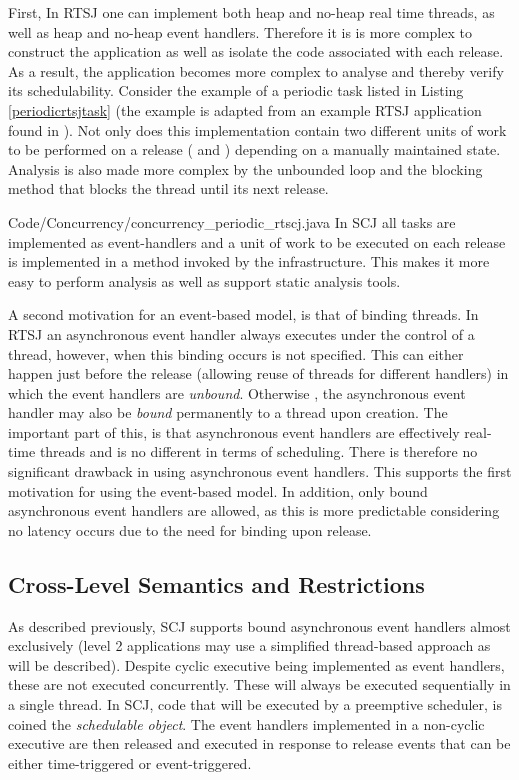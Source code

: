 First, In RTSJ one can implement both heap and no-heap real time threads, as well as heap and no-heap event handlers. Therefore it is is more complex to construct the application as well as isolate the code associated with each release. As a result, the application becomes more complex to analyse and thereby verify its schedulability. Consider the example of a periodic task listed in Listing \ref{periodicrtsjtask} (the example is adapted from an example RTSJ application found in \cite{Schoeberl:2007:GCS:1288940.1288953}). Not only does this implementation contain two different units of work to be performed on a release ( and ) depending on a manually maintained state. Analysis is also made more complex by the unbounded loop and the blocking  method that blocks the thread until its next release.

{Code/Concurrency/concurrency_periodic_rtscj.java}
In SCJ all tasks are implemented as event-handlers and a unit of work to be executed on each release is implemented in a  method invoked by the infrastructure. This makes it more easy to perform analysis as well as support static analysis tools.

A second motivation for an event-based model, is that of binding threads. In RTSJ an asynchronous event handler always executes under the control of a thread, however, when this binding occurs is not specified. This can either happen just before the release (allowing reuse of threads for different handlers) in which the event handlers are \textit{unbound}. Otherwise , the asynchronous event handler may also be \textit{bound} permanently to a thread upon creation. The important part of this, is that asynchronous event handlers are effectively real-time threads and is no different in terms of scheduling. There is therefore no significant drawback in using asynchronous event handlers. This supports the first motivation for using the event-based model. In addition, only bound asynchronous event handlers are allowed, as this is more predictable considering no latency occurs due to the need for binding upon release.

\subsection{Cross-Level Semantics and Restrictions} %
\label{sub:cross_level_restrictions}
As described previously, SCJ supports bound asynchronous event handlers almost exclusively (level 2 applications may use a simplified thread-based approach as will be described). Despite cyclic executive being implemented as event handlers, these are not executed concurrently. These will always be executed sequentially in a single thread.
In SCJ, code that will be executed by a preemptive scheduler, is coined the \textit{schedulable object}. The event handlers implemented in a non-cyclic executive are then released and executed in response to release events that can be either time-triggered or event-triggered. 

